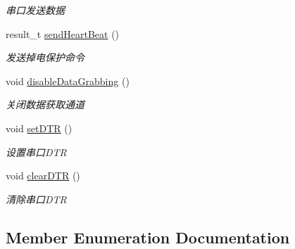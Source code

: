\begin{DoxyCompactItemize}
\begin{DoxyCompactList}\small\item\em 串口发送数据 ~\newline
\end{DoxyCompactList}\item 
result\+\_\+t \hyperlink{classydlidar_1_1_y_dlidar_driver_a6e7dc7cd2a73d24a763cebde840a5d30}{send\+Heart\+Beat} ()
\begin{DoxyCompactList}\small\item\em 发送掉电保护命令 ~\newline
\end{DoxyCompactList}\item 
void \hyperlink{classydlidar_1_1_y_dlidar_driver_ae66565bee3cdb8b74698b691f2ab1e63}{disable\+Data\+Grabbing} ()\hypertarget{classydlidar_1_1_y_dlidar_driver_ae66565bee3cdb8b74698b691f2ab1e63}{}\label{classydlidar_1_1_y_dlidar_driver_ae66565bee3cdb8b74698b691f2ab1e63}

\begin{DoxyCompactList}\small\item\em 关闭数据获取通道 ~\newline
\end{DoxyCompactList}\item 
void \hyperlink{classydlidar_1_1_y_dlidar_driver_a88de43cf13058344fc83389cb9df7e21}{set\+D\+TR} ()\hypertarget{classydlidar_1_1_y_dlidar_driver_a88de43cf13058344fc83389cb9df7e21}{}\label{classydlidar_1_1_y_dlidar_driver_a88de43cf13058344fc83389cb9df7e21}

\begin{DoxyCompactList}\small\item\em 设置串口\+D\+TR ~\newline
\end{DoxyCompactList}\item 
void \hyperlink{classydlidar_1_1_y_dlidar_driver_a67fe00d7458cdb52b4160d745b8ecd32}{clear\+D\+TR} ()\hypertarget{classydlidar_1_1_y_dlidar_driver_a67fe00d7458cdb52b4160d745b8ecd32}{}\label{classydlidar_1_1_y_dlidar_driver_a67fe00d7458cdb52b4160d745b8ecd32}

\begin{DoxyCompactList}\small\item\em 清除串口\+D\+TR ~\newline
\end{DoxyCompactList}\end{DoxyCompactItemize}


\subsection{Member Enumeration Documentation}
